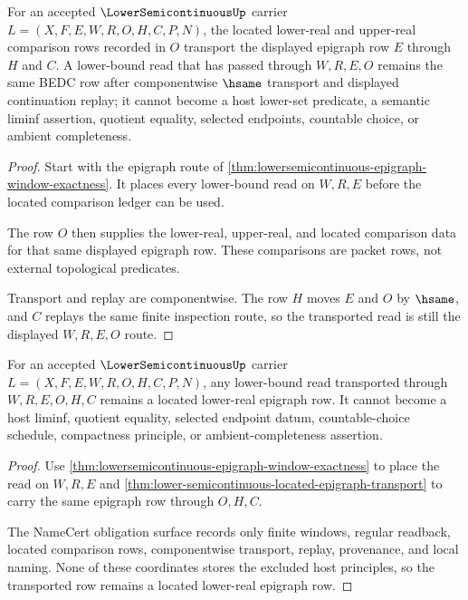 \begin{theorem}
\label{thm:lower-semicontinuous-located-epigraph-transport}
For an accepted $\LowerSemicontinuousUp$ carrier
$L=(X,F,E,W,R,O,H,C,P,N)$, the located lower-real and upper-real comparison
rows recorded in $O$ transport the displayed epigraph row $E$ through $H$ and
$C$. A lower-bound read that has passed through $W,R,E,O$ remains the same
BEDC row after componentwise $\hsame$ transport and displayed continuation
replay; it cannot become a host lower-set predicate, a semantic liminf
assertion, quotient equality, selected endpoints, countable choice, or ambient
completeness.
\end{theorem}
\begin{proof}
Start with the epigraph route of
\autoref{thm:lowersemicontinuous-epigraph-window-exactness}. It places every
lower-bound read on $W,R,E$ before the located comparison ledger can be used.

The row $O$ then supplies the lower-real, upper-real, and located comparison
data for that same displayed epigraph row. These comparisons are packet rows,
not external topological predicates.

Transport and replay are componentwise. The row $H$ moves $E$ and $O$ by
$\hsame$, and $C$ replays the same finite inspection route, so the transported
read is still the displayed $W,R,E,O$ route.
\end{proof}

\begin{theorem}
\label{thm:lower-semicontinuous-epigraph-located-stability}
For an accepted $\LowerSemicontinuousUp$ carrier $L=(X,F,E,W,R,O,H,C,P,N)$, any lower-bound read transported through $W,R,E,O,H,C$ remains a located lower-real epigraph row. It cannot become a host liminf, quotient equality, selected endpoint datum, countable-choice schedule, compactness principle, or ambient-completeness assertion.
\end{theorem}
\begin{proof}
Use \autoref{thm:lowersemicontinuous-epigraph-window-exactness} to place the read on $W,R,E$ and \autoref{thm:lower-semicontinuous-located-epigraph-transport} to carry the same epigraph row through $O,H,C$.

The NameCert obligation surface records only finite windows, regular readback, located comparison rows, componentwise transport, replay, provenance, and local naming. None of these coordinates stores the excluded host principles, so the transported row remains a located lower-real epigraph row.
\end{proof}

